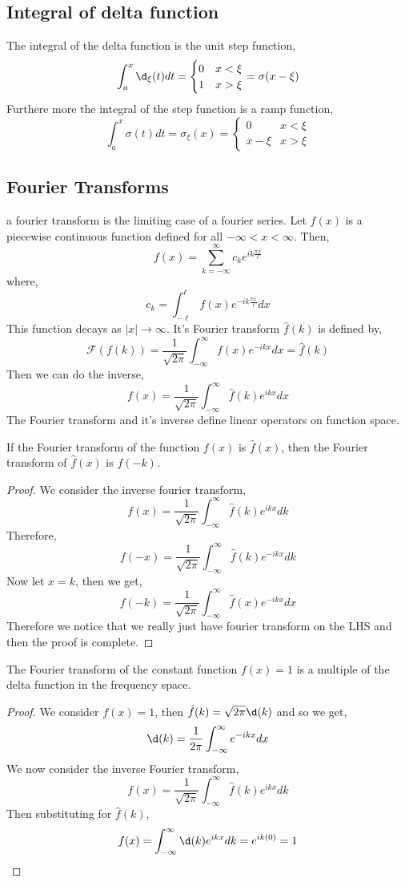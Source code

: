\subsection{Integral of delta function}
The integral of the delta function is the unit step function,
$$ \int_a^x \d_\xi (t)dt = \begin{cases}
  0 & x < \xi \\
  1 & x > \xi
\end{cases} = \sigma (x - \xi)$$
Furthere more the integral of the step function is a ramp function,
$$ \int_a^x \sigma (t)dt = \sigma_\xi (x) = \begin{cases}
  0 & x < \xi \\
  x - \xi & x > \xi
\end{cases} $$

\subsection{Fourier Transforms}
a fourier transform is the limiting case of a fourier series. Let $f(x)$ is a piecewise continuous function defined for all $-\infty < x < \infty$. Then,
$$ f(x) = \sum_{k = -\infty}^\infty c_ke^{ik \frac{\pi x}{\ell}} $$
where,
$$ c_k = \int_{-\ell}^\ell f(x)e^{-ik \frac{\pi x}{\ell}}dx $$
This function decays as $|x|\to \infty$. It's Fourier transform $\hat f(k)$ is defined by,
$$ \mathcal{F} (f(k)) = \frac{1}{\sqrt{2\pi}}\int_{-\infty}^\infty f(x)e^{-ikx}dx = \hat f(k)   $$
Then we can do the inverse,
$$ f(x) = \frac{1}{\sqrt{2\pi}}\int_{-\infty}^\infty \hat f(k)e^{ikx}dx $$
The Fourier transform and it's inverse define linear operators on function space.

\begin{nthm}[]
  If the Fourier transform of the function $f(x)$ is $\hat f(x)$, then the Fourier transform of $\hat f(x)$ is $f(-k)$.
\end{nthm}
\begin{proof}
  We consider the inverse fourier transform,
  $$ f(x) = \frac{1}{\sqrt{2\pi}}\int_{-\infty}^\infty \hat f(k)e^{ikx}dk $$
  Therefore,
  $$ f(-x) = \frac{1}{\sqrt{2\pi}}\int_{-\infty}^\infty \hat f(k)e^{-ikx}dk $$
  Now let $x = k$, then we get,
  $$ f(-k) = \frac{1}{\sqrt{2\pi}}\int_{-\infty}^\infty \hat f(x)e^{-ikx}dx $$
  Therefore we notice that we really just have fourier transform on the LHS and then the proof is complete.
\end{proof}

\begin{nthm}[]
  The Fourier transform of the constant function $f(x) = 1$ is a multiple of the delta function in the frequency space.
\end{nthm}
\begin{proof}
  We consider $f(x) = 1$, then $\hat f(k) = \sqrt{2\pi}\d (k)$ and so we get,
  $$ \d(k) = \frac{1}{2\pi}\int_{-\infty}^\infty e^{-ikx}dx $$
  We now consider the inverse Fourier transform,
  $$ f(x) = \frac{1}{\sqrt{2\pi}}\int_{-\infty}^\infty \hat f(k)e^{ikx}dk $$
  Then substituting for $\hat f(k)$,
  $$ f(x) = \int_{-\infty}^\infty \d(k)e^{ikx}dk = e^{ik (0)} = 1 $$
\end{proof}

